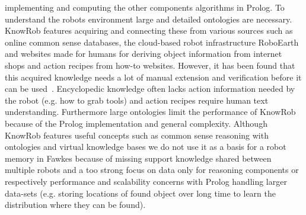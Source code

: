 \documentclass[a4paper,11pt]{article}
\begin{document}
implementing and computing the other components algorithms in Prolog.
To understand the robots environment large and detailed ontologies are
necessary. KnowRob features acquiring and connecting these from
various sources such as online common sense databases, the cloud-based
robot infrastructure RoboEarth and websites made for humans for
deriving object information from internet shops and action recipes
from how-to websites. However, it has been found that this acquired
knowledge needs a lot of manual extension and verification before it
can be used~\cite{KnowRob-Web}. Encyclopedic knowledge often lacks
action information needed by the robot (e.g. how to grab tools) and
action recipes require human text understanding. Furthermore large
ontologies limit the performance of KnowRob because of the Prolog
implementation and general complexity. Although KnowRob features
useful concepts such as common sense reasoning with ontologies and
virtual knowledge bases we do not use it as a basis for a robot memory
in Fawkes because of missing support knowledge shared between multiple
robots and a too strong focus on data only for reasoning components or
respectively performance and scalability concerns with Prolog handling
larger data-sets (e.g. storing locations of found object over long time
to learn the distribution where they can be found).
\end{document}
